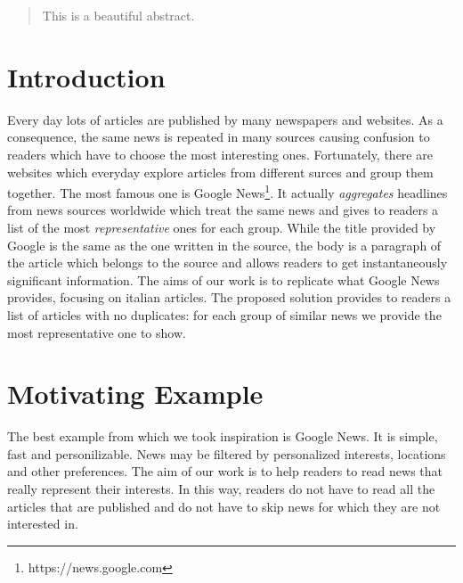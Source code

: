 \documentclass{acm_proc_article-sp}
\begin{document}
\maketitle
\begin{abstract}
\vspace{2mm}
This is a beautiful abstract.
\end{abstract}

\section{Introduction}
\vspace{2mm}
Every day lots of articles are published by many newspapers and websites. As a consequence, the same news is repeated in many sources causing confusion to readers which have to choose the most interesting ones. Fortunately, there are websites which everyday explore articles from different surces and group them together. The most famous one is Google News\footnote{https://news.google.com}. It actually \textit{aggregates} headlines from news sources worldwide which treat the same news and gives to readers a list of the most \textit{representative} ones for each group. While the title provided by Google is the same as the one written in the source, the body is a paragraph of the article which belongs to the source and allows readers to get instantaneously significant information. The aims of our work is to replicate what Google News provides, focusing on italian articles. The proposed solution provides to readers a list of articles with no duplicates: for each group of similar news we provide the most representative one to show.

\section{Motivating Example}
\vspace{2mm}
The best example from which we took inspiration is Google News. It is simple, fast and personilizable. News may be filtered by personalized interests, locations and other preferences. The aim of our work is to help readers to read news that really represent their interests. In this way, readers do not have to read all the articles that are published and do not have to skip news for which they are not interested in.

\end{document}
